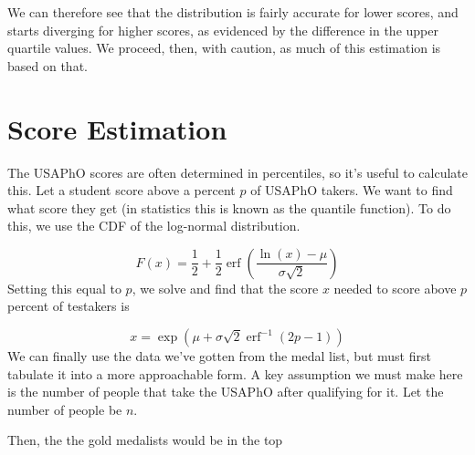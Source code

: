\documentclass{article}
\DeclareMathOperator\erf{erf}
\begin{document}
We can therefore see that the distribution is fairly accurate for lower scores, and starts diverging for higher scores, as evidenced by the difference in the upper quartile values.
We proceed, then, with caution, as much of this estimation is based on that.

\section{Score Estimation}

The USAPhO scores are often determined in percentiles, so it's useful to calculate this.
Let a student score above a percent $p$ of USAPhO takers.
We want to find what score they get (in statistics this is known as the quantile function).
To do this, we use the CDF of the log-normal distribution.

\[
    F(x) = \frac{1}{2} + \frac{1}{2} \erf{\left ( \frac{\ln(x) - \mu}{\sigma \sqrt{2}} \right)}
\]
Setting this equal to $p$, we solve and find that the score $x$ needed to score above $p$ percent of testakers is

\[
    x = \exp(\mu + \sigma \sqrt{2} \erf^{-1} (2p-1))
\]
We can finally use the data we've gotten from the medal list, but must first tabulate it into a more approachable form.
A key assumption we must make here is the number of people that take the USAPhO after qualifying for it.
Let the number of people be $n$.

Then, the the gold medalists would be in the top 
\end{document}
